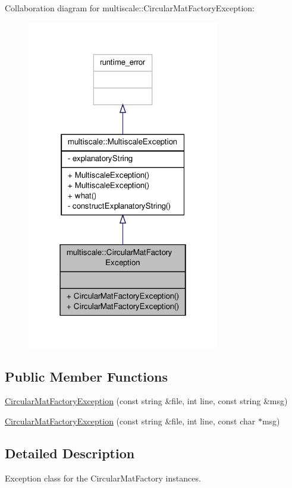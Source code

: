 Collaboration diagram for multiscale\-:\-:Circular\-Mat\-Factory\-Exception\-:\nopagebreak
\begin{figure}[H]
\begin{center}
\leavevmode
\includegraphics[width=238pt]{classmultiscale_1_1CircularMatFactoryException__coll__graph}
\end{center}
\end{figure}
\subsection*{Public Member Functions}
\begin{DoxyCompactItemize}
\item 
\hyperlink{classmultiscale_1_1CircularMatFactoryException_af9876b3e4dc7681bf52e03ac5375957a}{Circular\-Mat\-Factory\-Exception} (const string \&file, int line, const string \&msg)
\item 
\hyperlink{classmultiscale_1_1CircularMatFactoryException_a213e2ed3c46f995f9fa20e5ac73cfdf3}{Circular\-Mat\-Factory\-Exception} (const string \&file, int line, const char $\ast$msg)
\end{DoxyCompactItemize}


\subsection{Detailed Description}
Exception class for the Circular\-Mat\-Factory instances. 

